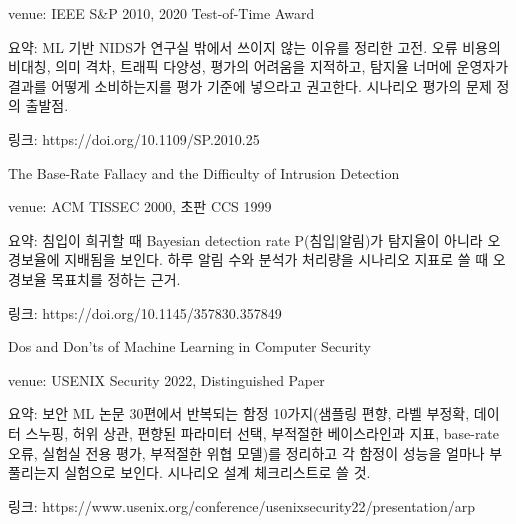 \par\noindent \textbullet\enspace venue: IEEE S\&P 2010, 2020 Test-of-Time Award


\par\noindent \textbullet\enspace 요약: ML 기반 NIDS가 연구실 밖에서 쓰이지 않는 이유를 정리한 고전. 오류 비용의 비대칭, 의미 격차, 트래픽 다양성, 평가의 어려움을 지적하고, 탐지율 너머에 운영자가 결과를 어떻게 소비하는지를 평가 기준에 넣으라고 권고한다. 시나리오 평가의 문제 정의 출발점.


\par\noindent \textbullet\enspace 링크: https:/\allowbreak{}/\allowbreak{}doi.org/\allowbreak{}10.1109/\allowbreak{}SP.2010.25



\par\noindent \textbullet\enspace The Base-Rate Fallacy and the Difficulty of Intrusion Detection

\par\noindent \textbullet\enspace venue: ACM TISSEC 2000, 초판 CCS 1999


\par\noindent \textbullet\enspace 요약: 침입이 희귀할 때 Bayesian detection rate P(침입|알림)가 탐지율이 아니라 오경보율에 지배됨을 보인다. 하루 알림 수와 분석가 처리량을 시나리오 지표로 쓸 때 오경보율 목표치를 정하는 근거.


\par\noindent \textbullet\enspace 링크: https:/\allowbreak{}/\allowbreak{}doi.org/\allowbreak{}10.1145/\allowbreak{}357830.357849



\par\noindent \textbullet\enspace Dos and Don'ts of Machine Learning in Computer Security

\par\noindent \textbullet\enspace venue: USENIX Security 2022, Distinguished Paper


\par\noindent \textbullet\enspace 요약: 보안 ML 논문 30편에서 반복되는 함정 10가지(샘플링 편향, 라벨 부정확, 데이터 스누핑, 허위 상관, 편향된 파라미터 선택, 부적절한 베이스라인과 지표, base-rate 오류, 실험실 전용 평가, 부적절한 위협 모델)를 정리하고 각 함정이 성능을 얼마나 부풀리는지 실험으로 보인다. 시나리오 설계 체크리스트로 쓸 것.


\par\noindent \textbullet\enspace 링크: https:/\allowbreak{}/\allowbreak{}www.usenix.org/\allowbreak{}conference/\allowbreak{}usenixsecurity22/\allowbreak{}presentation/\allowbreak{}arp



